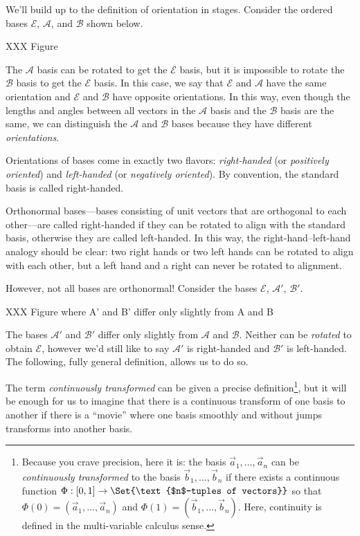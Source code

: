 We'll build up to the definition of orientation in stages. Consider the ordered bases $\mathcal E$, $\mathcal A$, and
$\mathcal B$ shown below.

XXX Figure

The $\mathcal A$ basis can be rotated to get the $\mathcal E$ basis, but it is impossible to rotate the $\mathcal B$ basis
to get the $\mathcal E$ basis. In this case, we say that $\mathcal E$ and $\mathcal A$ have the same orientation and
$\mathcal E$ and $\mathcal B$ have opposite orientations. In this way, even though the lengths and angles between all
vectors in the $\mathcal A$ basis and the $\mathcal B$ basis are the same, we can distinguish the $\mathcal A$ and $\mathcal B$
bases because they have different \emph{orientations}.

Orientations of bases come in exactly two flavors: \emph{right-handed} (or \emph{positively oriented})
and \emph{left-handed} (or \emph{negatively oriented}). By convention, the standard basis is called right-handed.

Orthonormal bases---bases consisting of unit vectors that are orthogonal
to each other---are called right-handed if they can be rotated to align with the standard basis, otherwise
they are called left-handed. In this way, the right-hand--left-hand analogy should be clear: two right hands or
two left hands can be rotated
to align with each other, but a left hand and a right can never be rotated to alignment.


However, not all bases are orthonormal! Consider the bases $\mathcal E$, $\mathcal A'$, $\mathcal B'$.

XXX Figure where A' and B' differ only slightly from A and B

The bases $\mathcal A'$ and $\mathcal B'$ differ only slightly from $\mathcal A$ and $\mathcal B$. Neither can
be \emph{rotated} to obtain $\mathcal E$, however we'd still like to say $\mathcal A'$ is right-handed and
$\mathcal B'$ is left-handed. The following, fully general definition, allows us to do so.


The term \emph{continuously transformed} can be given a precise definition\footnote{ Because you crave precision, here it is:
the basis $\vec a_1,\ldots, \vec a_n$ can be \emph{continuously transformed} to the basis $\vec b_1,\ldots,\vec b_n$ if there
exists a continuous function $\Phi:[0,1]\to\Set{\text{$n$-tuples of vectors}}$ so that $\Phi(0)=(\vec a_1,\ldots,\vec a_n)$
and $\Phi(1)=(\vec b_1,\ldots,\vec b_n)$. Here, continuity is defined in the multi-variable calculus sense.
}, but it will be enough for us
to imagine that there is a continuous transform of one basis to another if there is a ``movie'' where one
basis smoothly and without jumps transforms into another basis.

